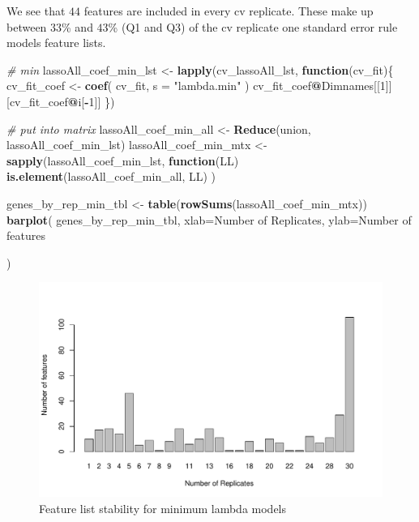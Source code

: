 \documentclass[
]{book}
\newenvironment{Shaded}{\begin{snugshade}}{\end{snugshade}}
\newcommand{\CommentTok}[1]{\textcolor[rgb]{0.56,0.35,0.01}{\textit{#1}}}
\newcommand{\ControlFlowTok}[1]{\textcolor[rgb]{0.13,0.29,0.53}{\textbf{#1}}}
\newcommand{\DataTypeTok}[1]{\textcolor[rgb]{0.13,0.29,0.53}{#1}}
\newcommand{\DecValTok}[1]{\textcolor[rgb]{0.00,0.00,0.81}{#1}}
\newcommand{\KeywordTok}[1]{\textcolor[rgb]{0.13,0.29,0.53}{\textbf{#1}}}
\newcommand{\NormalTok}[1]{#1}
\newcommand{\OperatorTok}[1]{\textcolor[rgb]{0.81,0.36,0.00}{\textbf{#1}}}
\newcommand{\StringTok}[1]{\textcolor[rgb]{0.31,0.60,0.02}{#1}}
\begin{document}
We see that \(44\) features are included in every
cv replicate. These make up between
\(33\)\%
and
\(43\)\%
(Q1 and Q3) of the cv replicate one standard error rule models feature lists.

\begin{Shaded}
\begin{Highlighting}[]
\CommentTok{\# min}
\NormalTok{lassoAll\_coef\_min\_lst <{-}}\StringTok{ }\KeywordTok{lapply}\NormalTok{(cv\_lassoAll\_lst, }\ControlFlowTok{function}\NormalTok{(cv\_fit)\{}
\NormalTok{ cv\_fit\_coef <{-}}\StringTok{ }\KeywordTok{coef}\NormalTok{(}
\NormalTok{ cv\_fit,}
 \DataTypeTok{s =} \StringTok{"lambda.min"}
\NormalTok{ )}
\NormalTok{ cv\_fit\_coef}\OperatorTok{@}\NormalTok{Dimnames[[}\DecValTok{1}\NormalTok{]][cv\_fit\_coef}\OperatorTok{@}\NormalTok{i[}\OperatorTok{{-}}\DecValTok{1}\NormalTok{]]}
\NormalTok{ \})}

\CommentTok{\# put into matrix}
\NormalTok{lassoAll\_coef\_min\_all <{-}}\StringTok{ }\KeywordTok{Reduce}\NormalTok{(union, lassoAll\_coef\_min\_lst)}
\NormalTok{lassoAll\_coef\_min\_mtx <{-}}\StringTok{ }\KeywordTok{sapply}\NormalTok{(lassoAll\_coef\_min\_lst, }
  \ControlFlowTok{function}\NormalTok{(LL) }\KeywordTok{is.element}\NormalTok{(lassoAll\_coef\_min\_all, LL)}
\NormalTok{)}

\NormalTok{genes\_by\_rep\_min\_tbl <{-}}\StringTok{ }\KeywordTok{table}\NormalTok{(}\KeywordTok{rowSums}\NormalTok{(lassoAll\_coef\_min\_mtx))}
\KeywordTok{barplot}\NormalTok{(}
\NormalTok{ genes\_by\_rep\_min\_tbl,}
 \DataTypeTok{xlab=}\StringTok{\textquotesingle{}Number of Replicates\textquotesingle{}}\NormalTok{,}
 \DataTypeTok{ylab=}\StringTok{\textquotesingle{}Number of features\textquotesingle{}}

\NormalTok{)}
\end{Highlighting}
\end{Shaded}

\begin{figure}
\centering
\includegraphics{Static/figures/feature-list-min-1.pdf}
\caption{\label{fig:feature-list-min}Feature list stability for minimum lambda models}
\end{figure}
\end{document}
